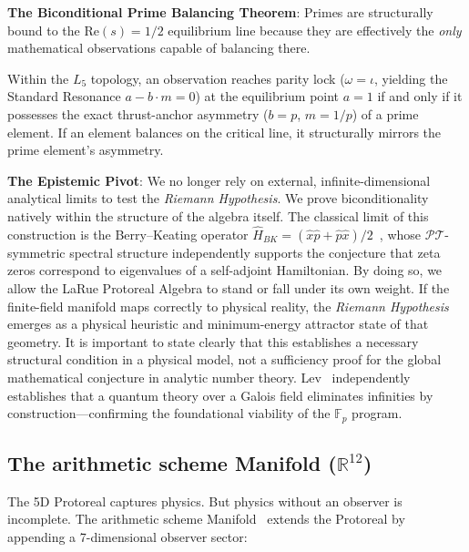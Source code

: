 \textbf{The Biconditional Prime Balancing Theorem}: Primes are structurally bound to the $\text{Re}(s) = 1/2$ equilibrium line because they are effectively the \emph{only} mathematical observations capable of balancing there. 

Within the $L_5$ topology, an observation reaches parity lock ($\omega = \iota$, yielding the Standard Resonance $a - b \cdot m = 0$) at the equilibrium point $a = 1$ if and only if it possesses the exact thrust-anchor asymmetry ($b = p$, $m = 1/p$) of a prime element. If an element balances on the critical line, it structurally mirrors the prime element's asymmetry.

\textbf{The Epistemic Pivot}: We no longer rely on external, infinite-dimensional analytical limits to test the \emph{Riemann Hypothesis}. We prove biconditionality natively within the structure of the algebra itself. The classical limit of this construction is the Berry--Keating operator $\hat{H}_{BK} = (\hat{x}\hat{p} + \hat{p}\hat{x})/2$~\cite{BenderBrodyMuller2017}, whose $\mathcal{PT}$-symmetric spectral structure independently supports the conjecture that zeta zeros correspond to eigenvalues of a self-adjoint Hamiltonian. By doing so, we allow the LaRue Protoreal Algebra to stand or fall under its own weight. If the finite-field manifold maps correctly to physical reality, the \emph{Riemann Hypothesis} emerges as a physical heuristic and minimum-energy attractor state of that geometry. It is important to state clearly that this establishes a necessary structural condition in a physical model, not a sufficiency proof for the global mathematical conjecture in analytic number theory. Lev~\cite{Lev2010} independently establishes that a quantum theory over a Galois field eliminates infinities by construction---confirming the foundational viability of the $\mathbb{F}_p$ program.

\subsection{The arithmetic scheme Manifold ($\mathbb{R}^{12}$)}

The 5D Protoreal captures physics. But physics without an observer is incomplete. The arithmetic scheme Manifold~\cite{arithmetic schemeManifold} extends the Protoreal by appending a 7-dimensional observer sector:

